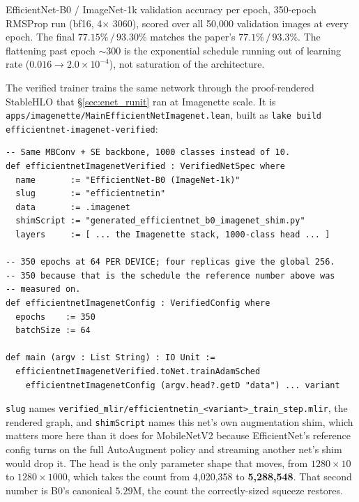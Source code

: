 \begin{center}
\end{center}

\noindent EfficientNet-B0 / ImageNet-1k validation accuracy per epoch,
350-epoch RMSProp run (bf16, 4$\times$ 3060), scored over all
50{,}000 validation images at every epoch. The final
$77.15\%\,/\,93.30\%$ matches the paper's $77.1\%\,/\,93.3\%$. The
flattening past
epoch $\sim$300 is the exponential schedule running out of learning rate
($0.016 \to 2.0\times10^{-4}$), not saturation of the architecture.

\label{sec:enet_phase4}

The verified trainer trains the same network through the proof-rendered
StableHLO that \S\ref{sec:enet_runit} ran at Imagenette scale. It is
\texttt{apps/imagenette/MainEfficientNetImagenet.lean}, built as
\texttt{lake build efficientnet-imagenet-verified}:

\begin{verbatim}
-- Same MBConv + SE backbone, 1000 classes instead of 10.
def efficientnetImagenetVerified : VerifiedNetSpec where
  name       := "EfficientNet-B0 (ImageNet-1k)"
  slug       := "efficientnetin"
  data       := .imagenet
  shimScript := "generated_efficientnet_b0_imagenet_shim.py"
  layers     := [ ... the Imagenette stack, 1000-class head ... ]

-- 350 epochs at 64 PER DEVICE; four replicas give the global 256.
-- 350 because that is the schedule the reference number above was
-- measured on.
def efficientnetImagenetConfig : VerifiedConfig where
  epochs    := 350
  batchSize := 64

def main (argv : List String) : IO Unit :=
  efficientnetImagenetVerified.toNet.trainAdamSched
    efficientnetImagenetConfig (argv.head?.getD "data") ... variant
\end{verbatim}

\noindent \texttt{slug} names
\texttt{verified\_mlir/efficientnetin\_<variant>\_train\_step.mlir}, the
rendered graph, and \texttt{shimScript} names this net's own augmentation
shim, which matters more here than it does for MobileNetV2 because
EfficientNet's reference config turns on the full AutoAugment policy and
streaming another net's shim would drop it. The head is the only
parameter shape that moves, from $1280 \times 10$ to $1280 \times 1000$,
which takes the count from 4,020,358 to \textbf{5,288,548}. That second
number is B0's canonical $5.29$M, the count the correctly-sized squeeze
restores.

